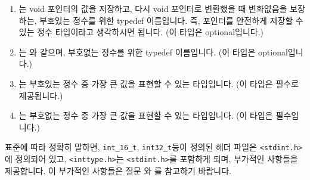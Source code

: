 \begin{faq}
\begin{enumerate}
          \item {}는 void 포인터의 값을 저장하고, 다시 void
            포인터로 변환했을 때 변화없음을 보장하는, 부호있는 정수를
            위한 typedef 이름입니다. 즉, 포인터를 안전하게 저장할 수 있는
            정수 타입이라고 생각하시면 됩니다. (이 타입은 optional입니다.)

          \item {}는 와 같으며, 부호없는
            정수를 위한 typedef 이름입니다. (이 타입은 optional입니다.)

          \item {}는 부호있는 정수 중 가장 큰 값을 표현할 수
            있는 타입입니다. (이 타입은 필수로 제공됩니다.)

          \item {}는 부호없는 정수 중 가장 큰 값을 표현할
            수 있는 타입입니다. (이 타입은 필수입니다.)
            
        \end{enumerate}

        표준에 따라 정확히 말하면, \verb+int_16_t+, \verb+int32_t+등이
        정의된 헤더 파일은 \verb+<stdint.h>+에 정의되어 있고,
        \verb+<inttype.h>+는 \verb+<stdint.h>+를
        포함하게 되며, 부가적인 사항들을 제공합니다. 이 부가적인 
        사항들은 질문 와 를 참고하기 바랍니다.

        
\end{faq}

%
%
